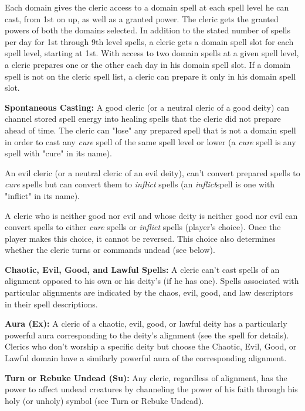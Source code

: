 Each domain gives the cleric access to a domain spell at each spell level he can cast, from 1st on up, as well as a granted power. The cleric gets the granted powers of both the domains selected. In addition to the stated number of spells per day for 1st through 9th level spells, a cleric gets a domain spell slot for each spell level, starting at 1st. With access to two domain spells at a given spell level, a cleric prepares one or the other each day in his domain spell slot. If a domain spell is not on the cleric spell list, a cleric can prepare it only in his domain spell slot.

\textbf{Spontaneous Casting:} A good cleric (or a neutral cleric of a good deity) can channel stored spell energy into healing spells that the cleric did not prepare ahead of time. The cleric can "lose" any prepared spell that is not a domain spell in order to cast any \textit{cure} spell of the same spell level or lower (a \textit{cure} spell is any spell with "cure" in its name). 

An evil cleric (or a neutral cleric of an evil deity), can't convert prepared spells to \textit{cure} spells but can convert them to \textit{inflict} spells (an \textit{inflict}spell is one with "inflict" in its name).

A cleric who is neither good nor evil and whose deity is neither good nor evil can convert spells to either \textit{cure} spells or \textit{inflict} spells (player's choice). Once the player makes this choice, it cannot be reversed. This choice also determines whether the cleric turns or commands undead (see below).

\textbf{Chaotic, Evil, Good, and Lawful Spells:} A cleric can't cast spells of an alignment opposed to his own or his deity's (if he has one). Spells associated with particular alignments are indicated by the chaos, evil, good, and law descriptors in their spell descriptions.

\textbf{Aura (Ex):} A cleric of a chaotic, evil, good, or lawful deity has a particularly powerful aura corresponding to the deity's alignment (see the  spell for details). Clerics who don't worship a specific deity but choose the Chaotic, Evil, Good, or Lawful domain have a similarly powerful aura of the corresponding alignment.

\textbf{Turn or Rebuke Undead (Su):} Any cleric, regardless of alignment, has the power to affect undead creatures by channeling the power of his faith through his holy (or unholy) symbol (see Turn or Rebuke Undead).


